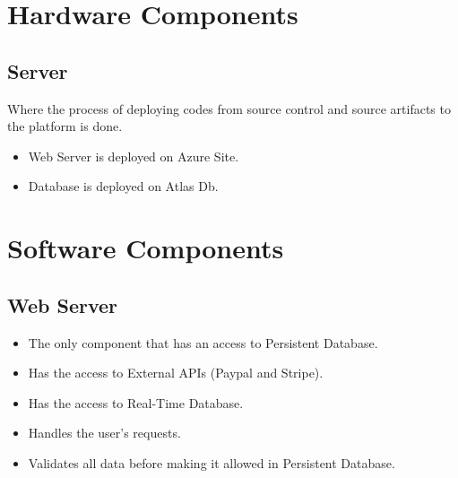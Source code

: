 \section{Hardware Components}
\subsection{Server}
\hspace{2cm} Where the process of deploying codes from source control and source artifacts to the platform is done.
\begin{itemize}
    \item Web Server is deployed on Azure Site.
    \item Database is deployed on Atlas Db.
\end{itemize}
\section{Software  Components}
\subsection{Web Server}
\begin{itemize}
    \item The only component that has an access to Persistent Database.
    \item Has the access to External APIs (Paypal and Stripe).
    \item Has the access to Real-Time Database.
    \item Handles the user's requests.
    \item Validates all data before making it allowed in Persistent Database.
\end{itemize}
